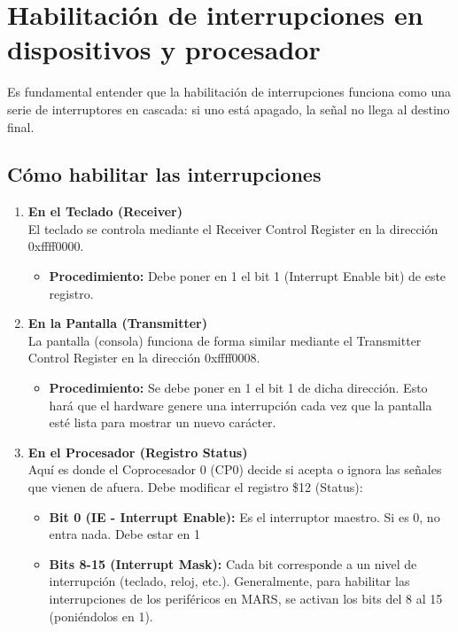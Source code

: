 \documentclass[]{article}
\begin{document}
\section{Habilitación de interrupciones en dispositivos y procesador}
	Es fundamental entender que la habilitación de interrupciones funciona como una serie de interruptores en cascada: si uno está apagado, la señal no llega al destino final.
	
	\subsection{Cómo habilitar las interrupciones}
		\begin{enumerate}
			\item \textbf{En el Teclado (Receiver)}\\
				El teclado se controla mediante el Receiver Control Register en la dirección 0xffff0000.
				\begin{itemize}
					\item \textbf{Procedimiento:} Debe poner en 1 el bit 1 (Interrupt Enable bit) de este registro.
				\end{itemize}
			\item \textbf{En la Pantalla (Transmitter)}\\
				La pantalla (consola) funciona de forma similar mediante el Transmitter Control Register en la dirección 0xffff0008.
				\begin{itemize}
					\item \textbf{Procedimiento:} Se debe poner en 1 el bit 1 de dicha dirección. Esto hará que el hardware genere una interrupción cada vez que la pantalla esté lista para mostrar un nuevo carácter.
				\end{itemize}
			\item \textbf{En el Procesador (Registro Status)}\\
				Aquí es donde el Coprocesador 0 (CP0) decide si acepta o ignora las señales que vienen de afuera. Debe modificar el registro \$12 (Status):
				\begin{itemize}
					\item \textbf{Bit 0 (IE - Interrupt Enable):} Es el interruptor maestro. Si es 0, no entra nada. Debe estar en 1
					\item \textbf{Bits 8-15 (Interrupt Mask):} Cada bit corresponde a un nivel de interrupción (teclado, reloj, etc.). Generalmente, para habilitar las interrupciones de los periféricos en MARS, se activan los bits del 8 al 15 (poniéndolos en 1).
				\end{itemize}
		\end{enumerate}
\end{document}
